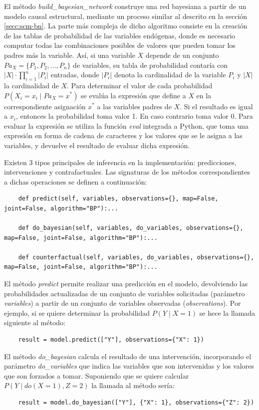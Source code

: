 El método \textit{build\_bayesian\_network} construye una red bayesiana a partir de un modelo causal estructural, mediante un proceso similar al descrito en la sección \ref{secc:scm-bn}. La parte más compleja de dicho algoritmo consiste en la creación de las tablas de probabilidad de las variables endógenas, donde es necesario computar todas las combinaciones posibles de valores que pueden tomar los padres más la variable. Así, si una variable $X$ depende de un conjunto $Pa_X=\{P_1, P_2, ..., P_n\}$ de variables, su tabla de probabilidad contaría con $|X| \cdot \prod_{i=1}^n |P_i|$ entradas, donde $|P_i|$ denota la cardinalidad de la variable $P_i$ y $|X|$ la cardinalidad de $X$. Para determinar el valor de cada probabilidad $P(X_i=x_i \mid Pa_X=x^{\ast})$ se evalúa la expresión que define a $X$ en la correspondiente asignación $x^{\ast}$ a las variables padres de $X$. Si el resultado es igual a $x_i$, entonces la probabilidad toma valor 1. En caso contrario toma valor 0. Para evaluar la expresión se utiliza la función \textit{eval} integrada a Python, que toma una expresión en forma de cadena de caracteres y los valores que se le asigna a las variables, y devuelve el resultado de evaluar dicha expresión.

Existen 3 tipos principales de inferencia en la implementación: predicciones, intervenciones y contrafactuales. Las signaturas de los métodos correspondientes a dichas operaciones se definen a continuación:

\begin{lstlisting}
	def predict(self, variables, observations={}, map=False, joint=False, algorithm="BP"):...
	
	def do_bayesian(self, variables, do_variables, observations={}, map=False, joint=False, algorithm="BP"):...
	
	def counterfactual(self, variables, do_variables, observations={}, map=False, joint=False, algorithm="BP"):...
\end{lstlisting}

El método \textit{predict} permite realizar una predicción en el modelo, devolviendo las probabilidades actualizadas de un conjunto de variables solicitadas (parámetro \textit{variables}) a partir de un conjunto de variables observadas (\textit{observations}). Por ejemplo, si se quiere determinar la probabilidad $P(Y \mid X=1)$ se hece la llamada siguiente al método:	
\begin{lstlisting}
	result = model.predict(["Y"], observations={"X": 1})
\end{lstlisting}	
El método \textit{do\_bayesian} calcula el resultado de una intervención, incorporando el parámetro \textit{do\_variables} que indica las variables que son intervenidas y los valores que son forzados a tomar. Suponiendo que se quiere calcular $P(Y \mid do(X=1), Z=2)$ la llamada al método sería:
\begin{lstlisting}
	result = model.do_bayesian(["Y"], {"X": 1}, observations={"Z": 2})
\end{lstlisting}

